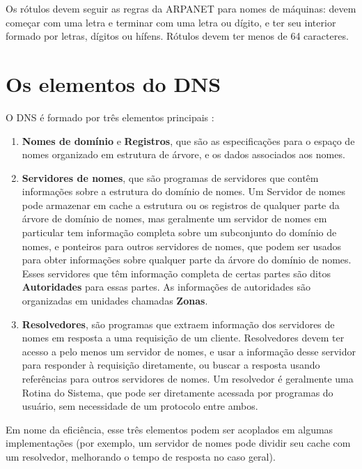 Os rótulos devem seguir as regras da ARPANET para nomes de máquinas:
devem começar com uma letra e terminar com uma letra ou dígito, e ter
seu interior formado por letras, dígitos ou hífens. Rótulos devem ter
menos de 64 caracteres.

\section{Os elementos do DNS}

O DNS é formado por três elementos principais \cite{rfc1034}:

\begin{enumerate}
\item \textbf{Nomes de domínio} e \textbf{Registros}, que são as
  especificações para o espaço de nomes organizado em estrutura de
  árvore, e os dados associados aos nomes.

\item \textbf{Servidores de nomes}, que são programas de servidores que
  contêm informações sobre a estrutura do domínio de nomes. Um Servidor
  de nomes pode armazenar em cache a estrutura ou os registros de
  qualquer parte da árvore de domínio de nomes, mas geralmente um
  servidor de nomes em particular tem informação completa sobre um
  subconjunto do domínio de nomes, e ponteiros para outros servidores de
  nomes, que podem ser usados para obter informações sobre qualquer
  parte da árvore do domínio de nomes. Esses servidores que têm
  informação completa de certas partes são ditos \textbf{Autoridades}
  para essas partes. As informações de autoridades são organizadas em
  unidades chamadas \textbf{Zonas}.

\item \textbf{Resolvedores}, são programas que extraem informação dos
  servidores de nomes em resposta a uma requisição de um
  cliente. Resolvedores devem ter acesso a pelo menos um servidor de
  nomes, e usar a informação desse servidor para responder à requisição
  diretamente, ou buscar a resposta usando referências para outros
  servidores de nomes. Um resolvedor é geralmente uma Rotina do Sistema,
  que pode ser diretamente acessada por programas do usuário, sem
  necessidade de um protocolo entre ambos.
\end{enumerate}

Em nome da eficiência, esse três elementos podem ser acoplados em
algumas implementações (por exemplo, um servidor de nomes pode dividir
seu cache com um resolvedor, melhorando o tempo de resposta no caso
geral).

